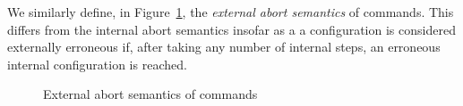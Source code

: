 \documentclass[11pt]{report}
\begin{document}
We similarly define, in Figure~\ref{fig:comm-ext-abort-rel}, the \emph{external abort semantics} of commands. This differs from the internal abort semantics insofar as a a configuration is considered externally erroneous if, after taking any number of internal steps, an erroneous internal configuration is reached. 

\begin{figure}[h]
	\centering

	
	\vspace{1em}

	
	\vspace{1em}

	
	\vspace{1em}

	\caption{External abort semantics of commands}
	\label{fig:comm-ext-abort-rel}
\end{figure}
\end{document}
